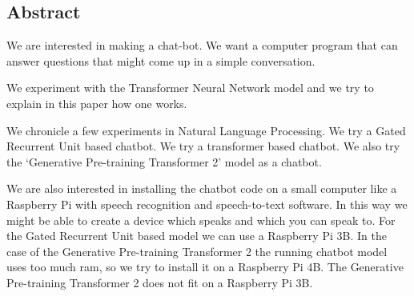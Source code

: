 
\begin{center}
	
\section*{Abstract}
\end{center}

We are interested in making a chat-bot. We want a computer program that can answer questions that might come up in a simple conversation.

We experiment with the Transformer Neural Network model and we try to explain in this paper how one works.

We chronicle a few experiments in Natural Language Processing. We try a Gated Recurrent Unit based chatbot. We try a transformer based chatbot. We also try the `Generative Pre-training Transformer 2' model as a chatbot. 

We are also interested in installing the chatbot code on a small computer like a Raspberry Pi with speech recognition and speech-to-text software. In this way we might be able to create a device which speaks and which you can speak to. For the Gated Recurrent Unit based model we can use a Raspberry Pi 3B. In the case of the Generative Pre-training Transformer 2 the running chatbot model uses too much ram, so we try to install it on a Raspberry Pi 4B. The Generative Pre-training Transformer 2 does not fit on a Raspberry Pi 3B.



